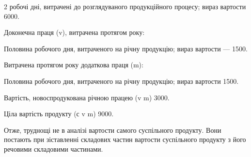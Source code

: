 2 робочі дні, витрачені до розглядуваного продукційного процесу;
вираз вартости \deq{} 6000.

Доконечна праця (v), витрачена протягом року:

Половина робочого дня, витраченого на річну продукцію; вираз вартости
— 1500.

Витрачена протягом року додаткова праця (m):

Половина робочого дня, витраченого на річну продукцію; вираз вартости
\deq{} 1500.

Вартість, новоспродукована річною працею (v \dplus{} m) \deq{} 3000.

Ціла вартість продукту (с \dplus{} v \dplus{} m) \deq{} 9000.

Отже, труднощі не в аналізі вартости самого суспільного продукту.
Вони постають при зіставленні складових частин вартости суспільного
продукту з його речовими складовими частинами.
